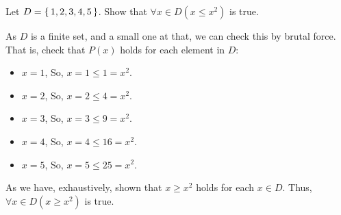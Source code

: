 \guard



\begin{exmp}
\label{exmp:univeralStatementOverFiniteSet}
  Let $D=\left\{\, 1,2,3,4,5 \,\right\}$.
	Show that $\forall x\in D(x \leq x^2)$ is true.

	As $D$ is a finite set, and a small one at that, we can check this by brutal force.
	That is, check that $P(x)$ holds for each element in $D$:
	\begin{itemize}
		\item $x=1$,
			So, $x=1 \leq 1 = x^2$.
		\item $x=2$,
			So, $x=2 \leq 4 = x^2$.
		\item $x=3$,
			So, $x=3 \leq 9 = x^2$.
		\item $x=4$,
			So, $x=4 \leq 16 = x^2$.
		\item $x=5$,
			So, $x=5 \leq 25 = x^2$.
	\end{itemize}
	As we have, exhaustively, shown that $x \geq x^2$ holds for each $x\in D$.
	Thus,  $\forall x\in D(x \geq x^2)$ is true.
\end{exmp}

